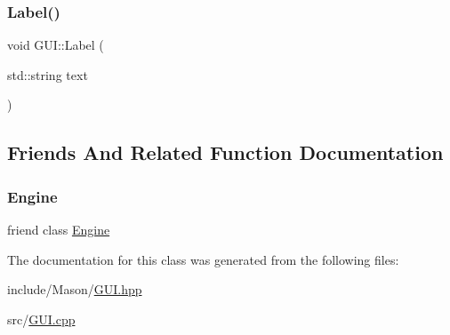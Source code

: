 \hypertarget{class_mason_1_1_g_u_i_aa13fcc98d1df0e5446b86b4baa01ce79}{}\label{class_mason_1_1_g_u_i_aa13fcc98d1df0e5446b86b4baa01ce79} 
\subsubsection{\texorpdfstring{Label()}{Label()}}
{\footnotesize\ttfamily void G\+U\+I\+::\+Label (\begin{DoxyParamCaption}\item[{std\+::string}]{text }\end{DoxyParamCaption})\hspace{0.3cm}{\ttfamily [static]}}



\subsection{Friends And Related Function Documentation}
\hypertarget{class_mason_1_1_g_u_i_a3e1914489e4bed4f9f23cdeab34a43dc}{}\label{class_mason_1_1_g_u_i_a3e1914489e4bed4f9f23cdeab34a43dc} 
\subsubsection{\texorpdfstring{Engine}{Engine}}
{\footnotesize\ttfamily friend class \hyperlink{class_mason_1_1_engine}{Engine}\hspace{0.3cm}{\ttfamily [friend]}}



The documentation for this class was generated from the following files\+:\begin{DoxyCompactItemize}
\item 
include/\+Mason/\hyperlink{_g_u_i_8hpp}{G\+U\+I.\+hpp}\item 
src/\hyperlink{_g_u_i_8cpp}{G\+U\+I.\+cpp}\end{DoxyCompactItemize}
